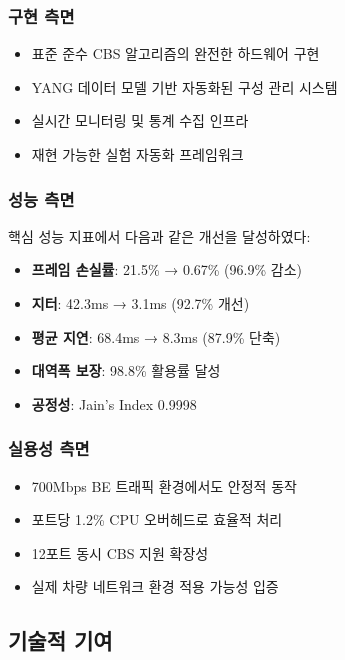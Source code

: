 \documentclass[twocolumn,10pt]{article}
\begin{document}
\subsubsection{구현 측면}

\begin{itemize}
    \item 표준 준수 CBS 알고리즘의 완전한 하드웨어 구현
    \item YANG 데이터 모델 기반 자동화된 구성 관리 시스템
    \item 실시간 모니터링 및 통계 수집 인프라
    \item 재현 가능한 실험 자동화 프레임워크
\end{itemize}

\subsubsection{성능 측면}

핵심 성능 지표에서 다음과 같은 개선을 달성하였다:

\begin{itemize}
    \item \textbf{프레임 손실률}: 21.5\% → 0.67\% (96.9\% 감소)
    \item \textbf{지터}: 42.3ms → 3.1ms (92.7\% 개선)
    \item \textbf{평균 지연}: 68.4ms → 8.3ms (87.9\% 단축)
    \item \textbf{대역폭 보장}: 98.8\% 활용률 달성
    \item \textbf{공정성}: Jain's Index 0.9998
\end{itemize}

\subsubsection{실용성 측면}

\begin{itemize}
    \item 700Mbps BE 트래픽 환경에서도 안정적 동작
    \item 포트당 1.2\% CPU 오버헤드로 효율적 처리
    \item 12포트 동시 CBS 지원 확장성
    \item 실제 차량 네트워크 환경 적용 가능성 입증
\end{itemize}

\subsection{기술적 기여}
\end{document}
